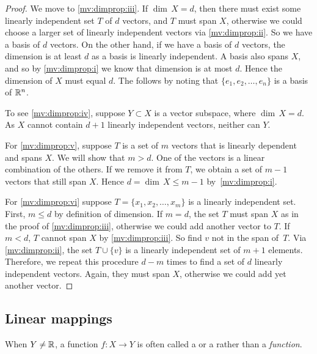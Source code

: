 \begin{proof}
We move to \ref{mv:dimprop:iii}.
If $\dim \, X = d$,
then there must exist some linearly independent set $T$ of $d$ vectors,
and $T$ must span $X$, otherwise we could choose a larger set of linearly
independent vectors via \ref{mv:dimprop:ii}.
So we have a basis of $d$ vectors.
On the other hand, if we have a basis of $d$ vectors,
the dimension is at least $d$ as a basis is linearly independent.
A basis also spans $X$, and so
by \ref{mv:dimprop:i} we know that dimension is at most $d$.
Hence the dimension of $X$ must equal $d$.
The  follows by noting that
$\{ e_1, e_2, \ldots, e_n \}$ is a basis of ${\mathbb{R}}^n$.

To see \ref{mv:dimprop:iv},
suppose $Y \subset X$ is a vector subspace,
where $\dim \, X = d$.  As $X$ cannot contain $d+1$ linearly independent
vectors, neither can $Y$.

For \ref{mv:dimprop:v}, suppose $T$ is a set of $m$ vectors
that is linearly dependent
and spans $X$.
We will show that $m > d$.
One of the
vectors is a linear combination of the others.  If we remove it
from $T$, we obtain a set of $m-1$ vectors that still span $X$.
Hence
$d = \dim \, X \leq m-1$ by~\ref{mv:dimprop:i}.

For \ref{mv:dimprop:vi} suppose $T = \{ x_1, x_2, \ldots, x_m \}$ is
a linearly independent set.  First, $m \leq d$ by definition of dimension.
If $m=d$, the set $T$ must span $X$ as in the proof of \ref{mv:dimprop:iii},
otherwise we could add another vector to $T$.
If $m < d$,  $T$ cannot span $X$ by \ref{mv:dimprop:iii}.
So find $v$ not in the span of~$T$.
Via \ref{mv:dimprop:ii}, the set $T \cup \{ v \}$ is
a linearly independent set of $m+1$ elements.
Therefore, we repeat this procedure $d-m$ times to
find a set of $d$ linearly independent vectors.
Again, they must span $X$, otherwise we could add yet another vector.
\end{proof}

\subsection{Linear mappings}

When $Y \not= {\mathbb{R}}$,
a function $f \colon X \to Y$ is often called a
\emph{} or a \emph{}
rather than a \emph{function}.

